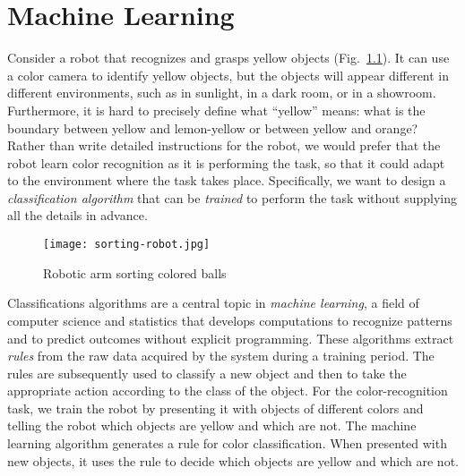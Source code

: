 
\chapter{Machine Learning}\label{ch.machine}


Consider a robot that recognizes and grasps yellow objects (Fig.~\ref{fig.sortballs}). It can use a color camera to identify yellow objects, but the objects will appear different in different environments, such as in sunlight, in a dark room, or in a showroom. Furthermore, it is hard to precisely define what ``yellow'' means: what is the boundary between yellow and lemon-yellow or between yellow and orange? Rather than write detailed instructions for the robot, we would prefer that the robot learn color recognition as it is performing the task, so that it  could adapt to the environment where the task takes place. Specifically, we want to design a \emph{classification algorithm} that can be \emph{trained} to perform the task without supplying all the details in advance.

\begin{figure}
\begin{center}
\texttt{[image: sorting-robot.jpg]}
\end{center}
\caption{Robotic arm sorting colored balls}\label{fig.sortballs}
\end{figure}

Classifications algorithms are a central topic in \emph{machine learning}, a field of computer science and statistics that develops computations to recognize patterns and to predict outcomes without explicit programming. These algorithms extract \emph{rules} from the raw data acquired by the system during a training period. The rules are subsequently used to classify a new object and then to take the appropriate action according to the class of the object. For the color-recognition task, we train the robot by presenting it with objects of different colors and telling the robot which objects are yellow and which are not. The machine learning algorithm generates a rule for color classification. When presented with new objects, it uses the rule to decide which objects are yellow and which are not.

